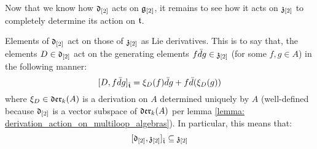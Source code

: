         Now that we know how $\mathfrak{d}_{[2]}$ acts on $\mathfrak{g}_{[2]}$, it remains to see how it acts on $\mathfrak{z}_{[2]}$ to completely determine its action on $\mathfrak{t}$. 
        \begin{lemma} \label{lemma: derivation_action_on_toroidal_centres}
            Elements of $\mathfrak{d}_{[2]}$ act on those of $\mathfrak{z}_{[2]}$ as Lie derivatives. This is to say that, the elements $D \in \mathfrak{d}_{[2]}$ act on the generating elements $f \bar{d}g \in \mathfrak{z}_{[2]}$ (for some $f, g \in A$) in the following manner:
                $$[D, f \bar{d}g]_{\hat{\mathfrak{t}}} = \xi_D(f) \bar{d}g + f \bar{d}(\xi_D(g))$$
            where $\xi_D \in \mathfrak{der}_k(A)$ is a derivation on $A$ determined uniquely by $A$ (well-defined because $\mathfrak{d}_{[2]}$ is a vector subspace of $\mathfrak{der}_k(A)$ per lemma \ref{lemma: derivation_action_on_multiloop_algebras}). In particular, this means that:
                $$[\mathfrak{d}_{[2]}, \mathfrak{z}_{[2]}]_{\hat{\mathfrak{t}}} \subseteq \mathfrak{z}_{[2]}$$
        \end{lemma}
